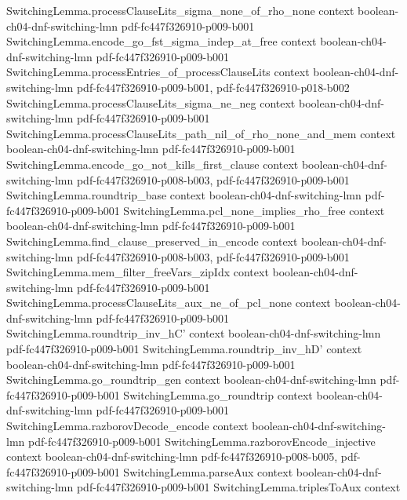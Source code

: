 \begin{lemma}
\proofstep
  {SwitchingLemma.processClauseLits_sigma_none_of_rho_none}
  {context}
  {boolean-ch04-dnf-switching-lmn}
  {pdf-fc447f326910-p009-b001}
\proofstep
  {SwitchingLemma.encode_go_fst_sigma_indep_at_free}
  {context}
  {boolean-ch04-dnf-switching-lmn}
  {pdf-fc447f326910-p009-b001}
\proofstep
  {SwitchingLemma.processEntries_of_processClauseLits}
  {context}
  {boolean-ch04-dnf-switching-lmn}
  {pdf-fc447f326910-p009-b001,
    pdf-fc447f326910-p018-b002}
\proofstep
  {SwitchingLemma.processClauseLits_sigma_ne_neg}
  {context}
  {boolean-ch04-dnf-switching-lmn}
  {pdf-fc447f326910-p009-b001}
\proofstep
  {SwitchingLemma.processClauseLits_path_nil_of_rho_none_and_mem}
  {context}
  {boolean-ch04-dnf-switching-lmn}
  {pdf-fc447f326910-p009-b001}
\proofstep
  {SwitchingLemma.encode_go_not_kills_first_clause}
  {context}
  {boolean-ch04-dnf-switching-lmn}
  {pdf-fc447f326910-p008-b003,
    pdf-fc447f326910-p009-b001}
\proofstep
  {SwitchingLemma.roundtrip_base}
  {context}
  {boolean-ch04-dnf-switching-lmn}
  {pdf-fc447f326910-p009-b001}
\proofstep
  {SwitchingLemma.pcl_none_implies_rho_free}
  {context}
  {boolean-ch04-dnf-switching-lmn}
  {pdf-fc447f326910-p009-b001}
\proofstep
  {SwitchingLemma.find_clause_preserved_in_encode}
  {context}
  {boolean-ch04-dnf-switching-lmn}
  {pdf-fc447f326910-p008-b003,
    pdf-fc447f326910-p009-b001}
\proofstep
  {SwitchingLemma.mem_filter_freeVars_zipIdx}
  {context}
  {boolean-ch04-dnf-switching-lmn}
  {pdf-fc447f326910-p009-b001}
\proofstep
  {SwitchingLemma.processClauseLits_aux_ne_of_pcl_none}
  {context}
  {boolean-ch04-dnf-switching-lmn}
  {pdf-fc447f326910-p009-b001}
\proofstep
  {SwitchingLemma.roundtrip_inv_hC'}
  {context}
  {boolean-ch04-dnf-switching-lmn}
  {pdf-fc447f326910-p009-b001}
\proofstep
  {SwitchingLemma.roundtrip_inv_hD'}
  {context}
  {boolean-ch04-dnf-switching-lmn}
  {pdf-fc447f326910-p009-b001}
\proofstep
  {SwitchingLemma.go_roundtrip_gen}
  {context}
  {boolean-ch04-dnf-switching-lmn}
  {pdf-fc447f326910-p009-b001}
\proofstep
  {SwitchingLemma.go_roundtrip}
  {context}
  {boolean-ch04-dnf-switching-lmn}
  {pdf-fc447f326910-p009-b001}
\proofstep
  {SwitchingLemma.razborovDecode_encode}
  {context}
  {boolean-ch04-dnf-switching-lmn}
  {pdf-fc447f326910-p009-b001}
\proofstep
  {SwitchingLemma.razborovEncode_injective}
  {context}
  {boolean-ch04-dnf-switching-lmn}
  {pdf-fc447f326910-p008-b005,
    pdf-fc447f326910-p009-b001}
\proofstep
  {SwitchingLemma.parseAux}
  {context}
  {boolean-ch04-dnf-switching-lmn}
  {pdf-fc447f326910-p009-b001}
\proofstep
  {SwitchingLemma.triplesToAux}
  {context}

\end{lemma}
